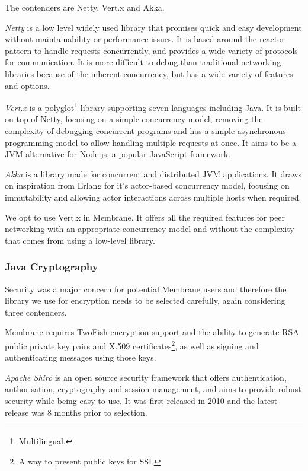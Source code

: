 \documentclass[11pt, a4paper, twoside]{report}
\begin{document}
The contenders are Netty, Vert.x and Akka.

\emph{Netty} is a low level widely used library that promises quick and easy development without maintainability or performance issues. \citep{netty2017site} It is based around the reactor pattern to handle requests concurrently, and provides a wide variety of protocols for communication. It is more difficult to debug than traditional networking libraries because of the inherent concurrency, but has a wide variety of features and options.

\emph{Vert.x} is a polyglot\footnote{Multilingual.} library supporting seven languages including Java. It is built on top of Netty, focusing on a simple concurrency model, removing the complexity of debugging concurrent programs and has a simple asynchronous programming model to allow handling multiple requests at once. It aims to be a JVM alternative for Node.js, a popular JavaScript framework. \citep{vertx2017site}

\emph{Akka} is a library made for concurrent and distributed JVM applications. It draws on inspiration from Erlang for it's actor-based concurrency model, focusing on immutability and allowing actor interactions across multiple hosts when required. \citep{gupta2012akka}

We opt to use Vert.x in Membrane. It offers all the required features for peer networking with an appropriate concurrency model and without the complexity that comes from using a low-level library.

\subsubsection{Java Cryptography}

Security was a major concern for potential Membrane users and therefore the library we use for encryption needs to be selected carefully, again considering three contenders.

Membrane requires TwoFish encryption support and the ability to generate RSA public private key pairs and X.509 certificates\footnote{A way to present public keys for SSL}, as well as signing and authenticating messages using those keys.

\emph{Apache Shiro} is an open source security framework that offers authentication, authorisation, cryptography and session management, and aims to provide robust security while being easy to use. It was first released in 2010 and the latest release was 8 months prior to selection. \citep{apache2017shiro}
\end{document}
